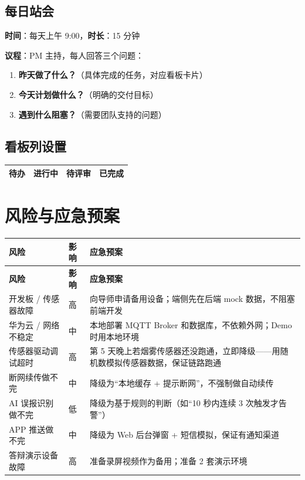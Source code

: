 \documentclass[UTF8,12pt,a4paper]{ctexart}
\begin{document}
\subsection{每日站会}

\textbf{时间}：每天上午 9:00，\textbf{时长}：15 分钟

\textbf{议程}：PM 主持，每人回答三个问题：
\begin{enumerate}
  \item \textbf{昨天做了什么？}（具体完成的任务，对应看板卡片）
  \item \textbf{今天计划做什么？}（明确的交付目标）
  \item \textbf{遇到什么阻塞？}（需要团队支持的问题）
\end{enumerate}

\subsection{看板列设置}

\begin{center}
\begin{tabular}{|C{2.5cm}|C{2.5cm}|C{2.5cm}|C{2.5cm}|}
\hline
{}\textbf{待办} & \textbf{进行中} & \textbf{待评审} & \textbf{已完成} \\
\hline
\end{tabular}
\end{center}

\section{风险与应急预案}

\begin{longtable}{L{3cm}C{1.5cm}L{8.5cm}}
\toprule
\textbf{风险} & \textbf{影响} & \textbf{应急预案} \\
\midrule
\endfirsthead
\toprule
\textbf{风险} & \textbf{影响} & \textbf{应急预案} \\
\midrule
\endhead
\bottomrule
\endfoot

开发板 / 传感器故障 & 高 & 向导师申请备用设备；端侧先在后端 mock 数据，不阻塞前端开发 \\
\midrule
华为云 / 网络不稳定 & 中 & 本地部署 MQTT Broker 和数据库，不依赖外网；Demo 时用本地环境 \\
\midrule
传感器驱动调试超时 & 高 & 第 5 天晚上若烟雾传感器还没跑通，立即降级——用随机数模拟传感器数据，保证链路跑通 \\
\midrule
断网续传做不完 & 中 & 降级为“本地缓存 + 提示断网”，不强制做自动续传 \\
\midrule
AI 误报识别做不完 & 低 & 降级为基于规则的判断（如“10 秒内连续 3 次触发才告警”） \\
\midrule
APP 推送做不完 & 中 & 降级为 Web 后台弹窗 + 短信模拟，保证有通知渠道 \\
\midrule
答辩演示设备故障 & 高 & 准备录屏视频作为备用；准备 2 套演示环境 \\
\bottomrule
\end{longtable}
\end{document}
